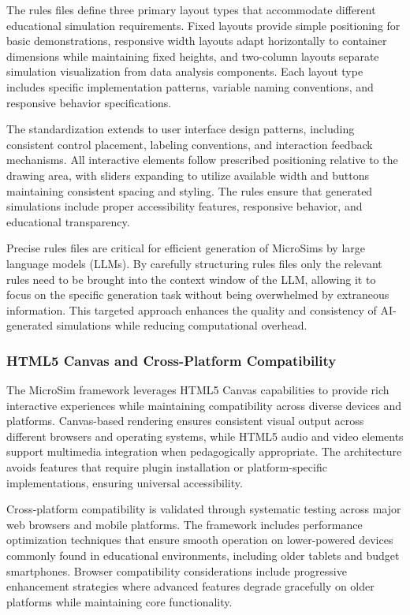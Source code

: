 The rules files define three primary layout types that accommodate different educational simulation requirements. Fixed layouts provide simple positioning for basic demonstrations, responsive width layouts adapt horizontally to container dimensions while maintaining fixed heights, and two-column layouts separate simulation visualization from data analysis components. Each layout type includes specific implementation patterns, variable naming conventions, and responsive behavior specifications.

The standardization extends to user interface design patterns, including consistent control placement, labeling conventions, and interaction feedback mechanisms. All interactive elements follow prescribed positioning relative to the drawing area, with sliders expanding to utilize available width and buttons maintaining consistent spacing and styling. The rules ensure that generated simulations include proper accessibility features, responsive behavior, and educational transparency.

Precise rules files are critical for efficient generation of MicroSims by large language models (LLMs).  By carefully structuring rules files only the relevant rules need to be brought into the context window of the LLM, allowing it to focus on the specific generation task without being overwhelmed by extraneous information.  This targeted approach enhances the quality and consistency of AI-generated simulations while reducing computational overhead.

\subsubsection{HTML5 Canvas and Cross-Platform Compatibility}

The MicroSim framework leverages HTML5 Canvas capabilities to provide rich interactive experiences while maintaining compatibility across diverse devices and platforms. Canvas-based rendering ensures consistent visual output across different browsers and operating systems, while HTML5 audio and video elements support multimedia integration when pedagogically appropriate. The architecture avoids features that require plugin installation or platform-specific implementations, ensuring universal accessibility.

Cross-platform compatibility is validated through systematic testing across major web browsers and mobile platforms. The framework includes performance optimization techniques that ensure smooth operation on lower-powered devices commonly found in educational environments, including older tablets and budget smartphones. Browser compatibility considerations include progressive enhancement strategies where advanced features degrade gracefully on older platforms while maintaining core functionality.

